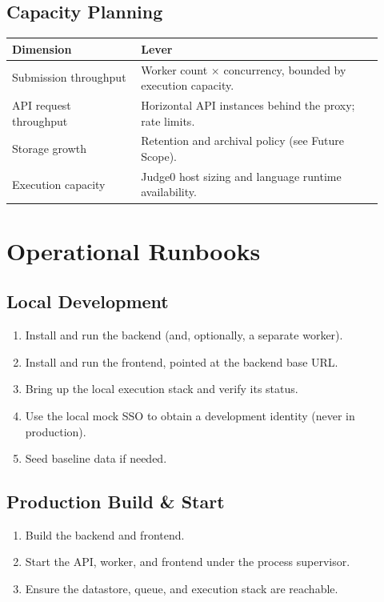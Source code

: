 \documentclass[12pt,a4paper,oneside]{report}
\begin{document}
\section{Capacity Planning}
\begin{longtable}{@{}p{0.32\linewidth} p{0.60\linewidth}@{}}
\toprule
\textbf{Dimension} & \textbf{Lever}\\
\midrule
\endhead
Submission throughput & Worker count $\times$ concurrency, bounded by execution capacity.\\
API request throughput & Horizontal API instances behind the proxy; rate limits.\\
Storage growth & Retention and archival policy (see Future Scope).\\
Execution capacity & Judge0 host sizing and language runtime availability.\\
\bottomrule
\end{longtable}

\chapter{Operational Runbooks}
\section{Local Development}
\begin{enumerate}[leftmargin=1.6em]
  \item Install and run the backend (and, optionally, a separate worker).
  \item Install and run the frontend, pointed at the backend base URL.
  \item Bring up the local execution stack and verify its status.
  \item Use the local mock SSO to obtain a development identity (never in
        production).
  \item Seed baseline data if needed.
\end{enumerate}

\section{Production Build \& Start}
\begin{enumerate}[leftmargin=1.6em]
  \item Build the backend and frontend.
  \item Start the API, worker, and frontend under the process supervisor.
  \item Ensure the datastore, queue, and execution stack are reachable.
\end{enumerate}
\end{document}
